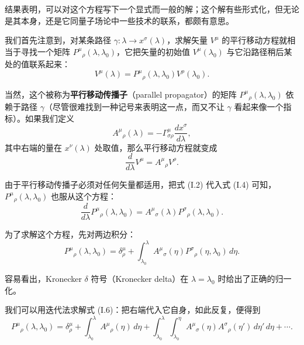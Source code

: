 结果表明，可以对这个方程写下一个显式而一般的解；这个解有些形式化，但无论是其本身，还是它同量子场论中一些技术的联系，都颇有意思。

我们首先注意到，对某条路径 $\gamma:\lambda\to x^\sigma(\lambda)$，求解矢量 $V^\mu$ 的平行移动方程就相当于寻找一个矩阵 $P^\mu{}_\rho(\lambda,\lambda_0)$，它把矢量的初始值 $V^\mu(\lambda_0)$ 与它沿路径稍后某处的值联系起来：
\begin{equation*}
V^\mu(\lambda) = P^\mu{}_\rho(\lambda,\lambda_0)V^\rho(\lambda_0).
\tag{I.2}
\end{equation*}

当然，这个被称为\textbf{平行移动传播子}（parallel propagator）的矩阵 $P^\mu{}_\rho(\lambda,\lambda_0)$ 依赖于路径 $\gamma$（尽管很难找到一种记号来表明这一点，而又不让 $\gamma$ 看起来像一个指标）。如果我们定义
\begin{equation*}
A^\mu{}_\rho(\lambda) = -\Gamma^\mu_{\sigma\rho}\frac{dx^\sigma}{d\lambda},
\tag{I.3}
\end{equation*}
其中右端的量在 $x^\nu(\lambda)$ 处取值，那么平行移动方程就变成
\begin{equation*}
\frac{d}{d\lambda}V^\mu = A^\mu{}_\rho V^\rho.
\tag{I.4}
\end{equation*}

由于平行移动传播子必须对任何矢量都适用，把式 (I.2) 代入式 (I.4) 可知，$P^\mu{}_\rho(\lambda,\lambda_0)$ 也服从这个方程：
\begin{equation*}
\frac{d}{d\lambda}P^\mu{}_\rho(\lambda,\lambda_0) = A^\mu{}_\sigma(\lambda)P^\sigma{}_\rho(\lambda,\lambda_0).
\tag{I.5}
\end{equation*}

为了求解这个方程，先对两边积分：
\begin{equation*}
P^\mu{}_\rho(\lambda,\lambda_0) = \delta^\mu_\rho + \int_{\lambda_0}^{\lambda} A^\mu{}_\sigma(\eta)P^\sigma{}_\rho(\eta,\lambda_0)\,d\eta.
\tag{I.6}
\end{equation*}

容易看出，Kronecker $\delta$ 符号（Kronecker delta）在 $\lambda=\lambda_0$ 时给出了正确的归一化。

我们可以用迭代法求解式 (I.6)：把右端代入它自身，如此反复，便得到
\begin{equation*}
P^\mu{}_\rho(\lambda,\lambda_0) = \delta^\mu_\rho + \int_{\lambda_0}^{\lambda} A^\mu{}_\rho(\eta)\,d\eta + \int_{\lambda_0}^{\lambda}\int_{\lambda_0}^{\eta} A^\mu{}_\sigma(\eta)A^\sigma{}_\rho(\eta')\,d\eta'\,d\eta + \cdots.
\tag{I.7}
\end{equation*}


